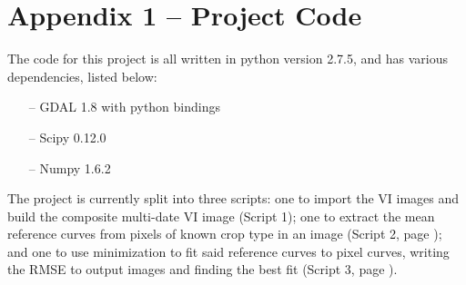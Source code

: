 \newpage
\section*{Appendix 1 -- Project Code}

The code for this project is all written in python version 2.7.5, and has various dependencies, listed below:

\begin{spacing}{1}
\begin{itemize}
  \item[--] GDAL 1.8 with python bindings
  \item[--] Scipy 0.12.0
  \item[--] Numpy 1.6.2
\end{itemize}
\end{spacing}

The project is currently split into three scripts: one to import the VI images and build the composite multi-date VI image (Script 1); one to extract the mean reference curves from pixels of known crop type in an image (Script 2, page \pageref{script2}); and one to use minimization to fit said reference curves to pixel curves, writing the RMSE to output images and finding the best fit (Script 3, page \pageref{script3}).


